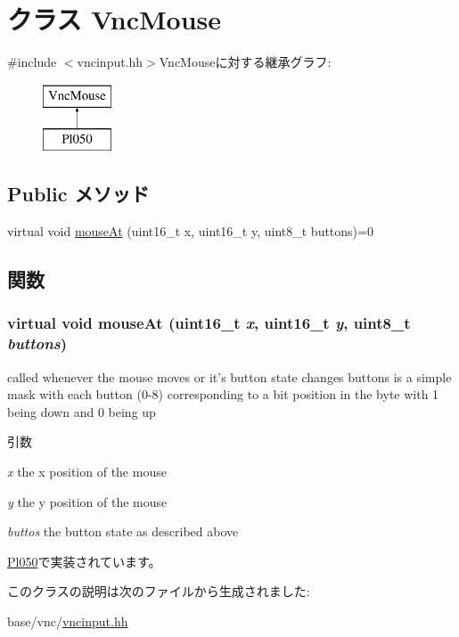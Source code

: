 \hypertarget{classVncMouse}{
\section{クラス VncMouse}
\label{classVncMouse}
}


{\ttfamily \#include $<$vncinput.hh$>$}VncMouseに対する継承グラフ:\begin{figure}[H]
\begin{center}
\leavevmode
\includegraphics[height=2cm]{classVncMouse}
\end{center}
\end{figure}
\subsection*{Public メソッド}
\begin{DoxyCompactItemize}
\item 
virtual void \hyperlink{classVncMouse_a9046dc82e20c004a2ac9b38f47ade145}{mouseAt} (uint16\_\-t x, uint16\_\-t y, uint8\_\-t buttons)=0
\end{DoxyCompactItemize}


\subsection{関数}
\hypertarget{classVncMouse_a9046dc82e20c004a2ac9b38f47ade145}{
\subsubsection[{mouseAt}]{\setlength{\rightskip}{0pt plus 5cm}virtual void mouseAt (uint16\_\-t {\em x}, \/  uint16\_\-t {\em y}, \/  uint8\_\-t {\em buttons})}}
\label{classVncMouse_a9046dc82e20c004a2ac9b38f47ade145}
called whenever the mouse moves or it's button state changes buttons is a simple mask with each button (0-\/8) corresponding to a bit position in the byte with 1 being down and 0 being up 
\begin{DoxyParams}{引数}
\item[{\em x}]the x position of the mouse \item[{\em y}]the y position of the mouse \item[{\em buttos}]the button state as described above \end{DoxyParams}


\hyperlink{classPl050_adfccd86af30aeaf063a1700dedde4788}{Pl050}で実装されています。

このクラスの説明は次のファイルから生成されました:\begin{DoxyCompactItemize}
\item 
base/vnc/\hyperlink{vncinput_8hh}{vncinput.hh}\end{DoxyCompactItemize}
